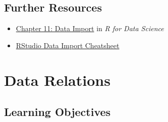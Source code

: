 \documentclass[
  oneside]{book}
\providecommand{\tightlist}{%
  \setlength{\itemsep}{0pt}\setlength{\parskip}{0pt}}
\begin{document}
\hypertarget{resources-data}{%
\section{Further Resources}\label{resources-data}}

\begin{itemize}
\tightlist
\item
  \href{http://r4ds.had.co.nz/data-import.html}{Chapter 11: Data Import} in \emph{R for Data Science}
\item
  \href{https://github.com/rstudio/cheatsheets/raw/master/data-import.pdf}{RStudio Data Import Cheatsheet}
\end{itemize}

\hypertarget{joins}{%
\chapter{Data Relations}\label{joins}}

\hypertarget{ilo-joins}{%
\section{Learning Objectives}\label{ilo-joins}}
\end{document}
